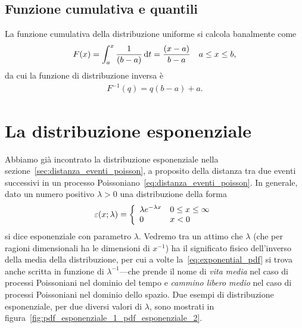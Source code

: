 \subsection{Funzione cumulativa e quantili}

La funzione cumulativa della distribuzione uniforme si calcola banalmente come
\begin{align}
  F(x) = \int_a^x \frac{1}{(b - a)} \diff[t] = \frac{(x - a)}{b - a}
  \quad a \leq x \leq b,
\end{align}
da cui la funzione di distribuzione inversa è
\begin{align}
  F^{-1}(q) = q(b - a) + a.
\end{align}


\section{La distribuzione esponenziale}
\label{sec:distribuzione_esponenziale}

Abbiamo già incontrato la distribuzione esponenziale nella
sezione~\ref{sec:distanza_eventi_poisson}, a proposito della distanza tra
due eventi successivi in un processo
Poissoniano~\eqref{eq:distanza_eventi_poisson}. In generale, dato un numero
positivo $\lambda > 0$ una distribuzione della forma
\begin{align}\label{eq:exponential_pdf}
  \exponentialpdf[\lambda]{x} = \left \{ \begin{array}{ll}
    \lambda e^{-\lambda x} & 0 \leq x \leq \infty\\
    0 & x < 0
  \end{array} \right.
\end{align}
si dice esponenziale con parametro $\lambda$. Vedremo tra un attimo che
$\lambda$ (che per ragioni dimensionali ha le dimensioni di $x^{-1}$) ha il
significato fisico dell'inverso della media della distribuzione, per cui
a volte la~\eqref{eq:exponential_pdf} si trova anche scritta in funzione
di $\lambda^{-1}$---che prende il nome di \emph{vita media} nel caso di processi
Poissoniani nel dominio del tempo e \emph{cammino libero medio} nel caso di
processi Poissoniani nel dominio dello spazio. Due esempi di distribuzione
esponenziale, per due diversi valori di $\lambda$, sono mostrati in
figura~\ref{fig:pdf_esponenziale_1_pdf_esponenziale_2}.



